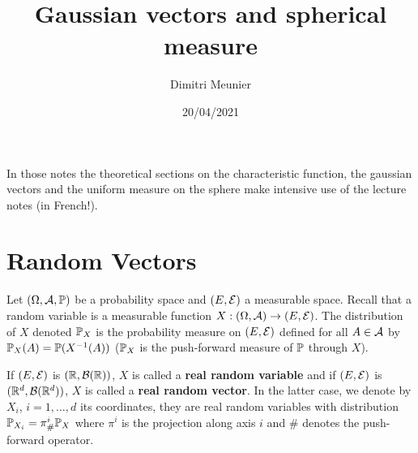 \documentclass{article}
\title{Gaussian vectors and spherical measure}
\author{Dimitri Meunier}
\date{20/04/2021}
\begin{document}
\maketitle



In those notes the theoretical sections on the characteristic function, the
gaussian vectors and the uniform measure on the sphere  make intensive use of
the lecture notes \citet{le2006integration} (in French!).

\section{Random Vectors}

Let $(\Omega,\cA,\P)$ be a probability space and $(E,\cE)$ a measurable space.
Recall that a random variable is a measurable function $X:(\Omega,\cA) \to
(E,\cE)$. The distribution of $X$ denoted $\P_X$ is the probability measure on
$(E,\cE)$ defined for all $A \in \cA$ by $\P_X(A) = \P(X^{-1}(A))$ ($\P_X$ is the
push-forward measure of $\P$ through $X$).

If $(E,\cE)$ is $(\R,\cB(\R))$, $X$ is called a \textbf{real random
variable} and if $(E,\cE)$ is $(\Rd,\cB(\Rd))$, $X$ is called a
\textbf{real random vector}. In the latter case, we denote by $X_i$,
$i=1,\ldots,d$ its coordinates, they are real random variables with distribution
$\P_{X_i} = \pi^i_{\#}\P_X$ where $\pi^i$ is the projection along axis $i$ and
$\#$ denotes the push-forward operator.
\end{document}
